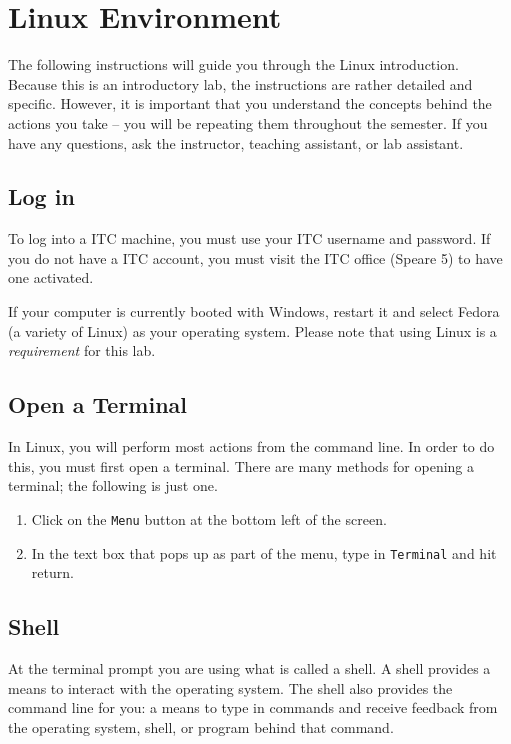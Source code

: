 \documentclass[11pt]{cselabheader}
\begin{document}
\pagebreak

\tableofcontents

\pagebreak

\section{Linux Environment}
\label{sec:linux}

The following instructions will guide you through the Linux introduction.
Because this is an introductory lab, the instructions are rather detailed and
specific. However, it is important that you understand the concepts behind the
actions you take -- you will be repeating them throughout the semester. If you
have any questions, ask the instructor, teaching assistant, or lab assistant.

\subsection{Log in}
To log into a ITC machine, you must use your ITC username and password. If you
do not have a ITC account, you must visit the ITC office (Speare 5) to have one
activated.

If your computer is currently booted with Windows, restart it and select Fedora
(a variety of Linux) as your operating system. Please note that using Linux is a
\emph{requirement} for this lab.

\subsection{Open a Terminal}
In Linux, you will perform most actions from the command line. In order to do
this, you must first open a terminal. There are many methods for opening a
terminal; the following is just one.

\begin{enumerate}
  \item Click on the \texttt{Menu} button at the bottom left of the screen.
  \item In the text box that pops up as part of the menu, type in
    \texttt{Terminal} and hit return.
\end{enumerate}


\subsection{Shell}
At the terminal prompt you are using what is called a shell. A shell
provides a means to interact with the operating system. The shell also provides
the command line for you: a means to type in commands and receive feedback from
the operating system, shell, or program behind that command.
\end{document}
